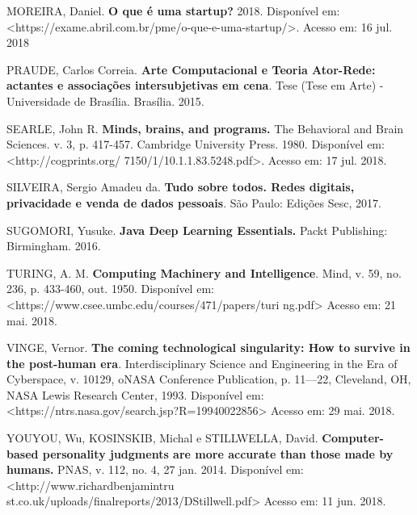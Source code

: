 MOREIRA, Daniel. \textbf{O que é uma startup?} 2018. Disponível em:
\textless{}https://exame.abril.com.br/pme/o-que-e-uma-startup/\textgreater{}.
Acesso em: 16 jul. 2018

PRAUDE, Carlos Correia. \textbf{Arte Computacional e Teoria Ator-Rede:
actantes e associações intersubjetivas em cena}. Tese (Tese em Arte) -
Universidade de Brasília. Brasília. 2015.

SEARLE, John R. \textbf{Minds, brains, and programs.} The Behavioral and
Brain Sciences. v. 3, p. 417-457. Cambridge University Press. 1980.
Disponível em:
\textless{}http://cogprints.org/
7150/1/10.1.1.83.5248.pdf\textgreater{}.
Acesso em: 17 jul. 2018.

SILVEIRA, Sergio Amadeu da. \textbf{Tudo sobre todos. Redes digitais,
privacidade e venda de dados pessoais}. São Paulo: Edições Sesc, 2017.

SUGOMORI, Yusuke. \textbf{Java Deep Learning Essentials.} Packt
Publishing: Birmingham. 2016.

TURING, A. M. \textbf{Computing Machinery and Intelligence}. Mind, v.
59, no. 236, p. 433-460, out. 1950. Disponível em:
\textless{}https://www.csee.umbc.edu/courses/471/papers/turi
ng.pdf\textgreater{}
Acesso em: 21 mai. 2018.

VINGE, Vernor. \textbf{The coming technological singularity: How to
survive in the post-human era}. Interdisciplinary Science and
Engineering in the Era of Cyberspace, v. 10129, oNASA Conference
Publication, p. 11---22, Cleveland, OH, NASA Lewis Research Center,
1993. Disponível em:
\textless{}https://ntrs.nasa.gov/search.jsp?R=19940022856\textgreater{}
Acesso em: 29 mai. 2018.

YOUYOU, Wu, KOSINSKIB, Michal e STILLWELLA, David.
\textbf{Computer-based personality judgments are more accurate than
those made by humans.} PNAS, v. 112, no. 4, 27 jan. 2014. Disponível em:
\textless{}http://www.richardbenjamintru
st.co.uk/uploads/finalreports/2013/DStillwell.pdf\textgreater{}
Acesso em: 11 jun. 2018.

